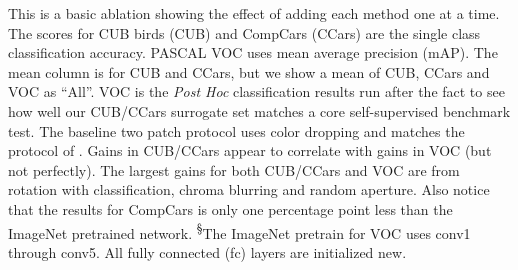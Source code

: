 \documentclass[10pt,twocolumn,letterpaper]{article}
\begin{document}
\begin{table*}
{This is a basic ablation showing the effect of adding each method one at a time. The scores for CUB birds (CUB) and CompCars (CCars) are the single class classification accuracy. PASCAL VOC uses mean average precision (mAP). The mean column is for CUB and CCars, but we show a mean of CUB, CCars and VOC as ``All''. VOC is the \emph{Post Hoc} classification results run after the fact to see how well our CUB/CCars surrogate set matches a core self-supervised benchmark test. The baseline two patch protocol uses color dropping and matches the protocol of \cite{Doersch15}. Gains in CUB/CCars appear to correlate with gains in VOC (but not perfectly). The largest gains for both CUB/CCars and VOC are from rotation with classification, chroma blurring and random aperture.  Also notice that the results for CompCars is only one percentage point less than the ImageNet pretrained network. \textcolor{myblue}{\textsuperscript{\S}}The ImageNet pretrain for VOC uses conv1 through conv5. All fully connected (fc) layers are initialized new.}
\label{table:ablation}
\end{table*}
\end{document}
